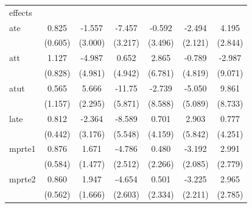 \begin{table}[htbp]
\begin{tabular}{l*{6}{c}}
\midrule
effects             &                     &                     &                     &                     &                     &                     \\
ate                 &       0.825         &      -1.557         &      -7.457\sym{**} &      -0.592         &      -2.494         &       4.195         \\
                    &     (0.605)         &     (3.000)         &     (3.217)         &     (3.496)         &     (2.121)         &     (2.844)         \\
\addlinespace
att                 &       1.127         &      -4.987         &       0.652         &       2.865         &      -0.789         &      -2.987         \\
                    &     (0.828)         &     (4.981)         &     (4.942)         &     (6.781)         &     (4.819)         &     (9.071)         \\
\addlinespace
atut                &       0.565         &       5.666\sym{**} &      -11.75\sym{**} &      -2.739         &      -5.050         &       9.861         \\
                    &     (1.157)         &     (2.295)         &     (5.871)         &     (8.588)         &     (5.089)         &     (8.733)         \\
\addlinespace
late                &       0.812\sym{*}  &      -2.364         &      -8.589         &       0.701         &       2.903         &       0.777         \\
                    &     (0.442)         &     (3.176)         &     (5.548)         &     (4.159)         &     (5.842)         &     (4.251)         \\
\addlinespace
mprte1              &       0.876         &       1.671         &      -4.786\sym{*}  &       0.480         &      -3.192         &       2.991         \\
                    &     (0.584)         &     (1.477)         &     (2.512)         &     (2.266)         &     (2.085)         &     (2.779)         \\
\addlinespace
mprte2              &       0.860         &       1.947         &      -4.654\sym{*}  &       0.501         &      -3.225         &       2.965         \\
                    &     (0.562)         &     (1.666)         &     (2.603)         &     (2.334)         &     (2.211)         &     (2.785)         \\

\end{tabular}
\end{table}
